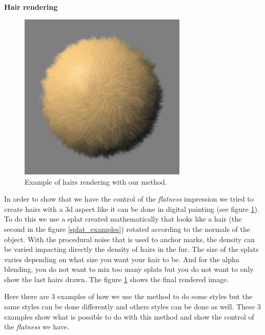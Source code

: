 \textbf{Hair rendering}

\begin{figure}[H]
    \begin{center}
    \includegraphics[width=80mm, height=80mm]{Resultats/bouledepoil1/final.png}
    \end{center}
    \caption{Example of hairs rendering with our method.}
    \label{final_hair}
\end{figure}

In order to show that we have the control of the \textit{flatness} impression we tried to create hairs with a 3d aspect like it can be done in digital painting (see figure \ref{final_hair}). To do this we use a splat created mathematically that looks like a hair (the second in the figure \ref{splat_examples}) rotated according to the normals of the object. With the procedural noise that is used to anchor marks, the density can be varied impacting directly the density of hairs in the fur. The size of the splats varies depending on what size you want your hair to be. And for the alpha blending, you do not want to mix too many splats but you do not want to only show the last hairs drawn. The figure \ref{final_hair} shows the final rendered image. \newline

Here there are 3 examples of how we use the method to do some styles but the same styles can be done differently and others styles can be done as well. These 3 examples show what is possible to do with this method and show the control of the \textit{flatness} we have.
